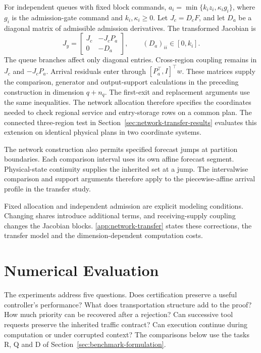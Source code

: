 \documentclass[preprint,12pt]{elsarticle}
\newcommand{\appref}[1]{\ref{#1}}
\begin{document}
For independent queues with fixed block commands,
$a_i=\min\{k_i z_i,\kappa_i g_i\}$, where $g_i$ is the admission-gate command and
$k_i,\kappa_i\ge0$. Let $J_c=D_cF$, and let $D_a$ be a diagonal matrix of
admissible admission derivatives. The transformed Jacobian is
\begin{equation}
 J_y=\begin{bmatrix}J_c&-J_cP_a\\0&-D_a\end{bmatrix},
 \qquad (D_a)_{ii}\in[0,k_i].
 \label{eq:network-jacobian}
\end{equation}
The queue branches affect only diagonal entries. Cross-region coupling
remains in $J_c$ and $-J_cP_a$. Arrival residuals enter through $[P_a^\top,I]^\top w$.
These matrices supply the comparison, generator and output-support calculations
in the preceding construction in dimension $q+n_q$. The first-exit and
replacement arguments use the same inequalities. The network allocation
therefore specifies the coordinates needed to check regional service and
entry-storage rows on a common plan. The connected three-region test in
Section~\ref{sec:network-transfer-results} evaluates this extension on
identical physical plans in two coordinate systems.

The network construction also permits specified forecast jumps at partition
boundaries. Each comparison interval uses its own affine forecast segment.
Physical-state continuity supplies the inherited set at a jump. The
intervalwise comparison and support arguments therefore apply to the
piecewise-affine arrival profile in the transfer study.

Fixed allocation and independent admission are explicit modeling conditions.
Changing shares introduce additional terms, and receiving-supply coupling changes
the Jacobian blocks. \appref{app:network-transfer} states these corrections,
the transfer model and the dimension-dependent computation costs.



\section{Numerical Evaluation}
\label{sec:new-evidence}

The experiments address five questions. Does certification preserve a
useful controller's performance? What does transportation structure add to
the proof? How much priority can be recovered after a rejection? Can
successive tool requests preserve the inherited traffic contract? Can
execution continue during computation or under corrupted context? The comparisons below use the tasks
R, Q and D of Section~\ref{sec:benchmark-formulation}.
\end{document}
